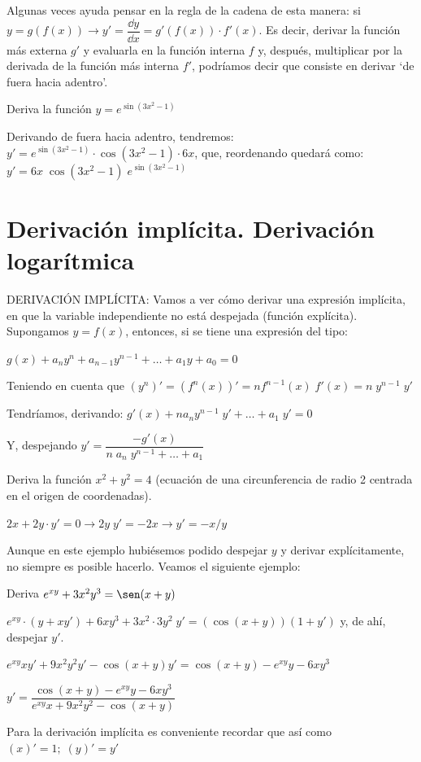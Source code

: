	Algunas veces ayuda pensar en la regla de la cadena de esta manera: si $y=g(f(x)) \to y'=\dfrac {\dd y}{\dd x}=g'(f(x))\cdot f'(x)$. Es decir, derivar la función más externa $g'$ y evaluarla en la función interna $f$ y, después, multiplicar por la derivada de la función más interna $f'$, podríamos decir que consiste en derivar `de fuera hacia adentro'.
	
	\begin{ejem} Deriva la función $y=e^{\sin (3x^2-1)}$
	
	Derivando de fuera hacia adentro, tendremos: $y'=e^{\sin (3x^2-1)}\cdot \cos(3x^2-1) \cdot 6x$, que, reordenando quedará como: $ y'=6x \; \cos(3x^2-1) \; e^{\sin (3x^2-1)}$	
	\end{ejem}
	
	\section{Derivación implícita. Derivación logarítmica}
	
	DERIVACIÓN IMPLÍCITA: Vamos a ver cómo derivar una expresión implícita, en que la variable independiente no está despejada (función explícita). Supongamos $y=f(x)$, entonces, si se tiene una expresión del tipo:
	
	$g(x)+a_ny^n+a_{n-1}y^{n-1}+ \dots + a_1y+a_0=0$
	
	Teniendo en cuenta que $(y^n)'=(f^n(x))'=nf^{n-1}(x)\; f'(x)=n\; y^{n-1}\; y'$
	
	Tendríamos, derivando: $g'(x)+n a_n y^{n-1}\; y' +\dots +a_1\; y' =0$
	
	Y, despejando $y'=\dfrac {-g'(x)}{n\; a_n\; y^{n-1} + \dots + a_1}$
	
	\begin{ejem} Deriva la función $x^2+y^2=4$ \textcolor{gris}{(ecuación de una circunferencia de radio 2 centrada en el origen de coordenadas)}.
	
	$2x+2y\cdot y'=0 \to 2y\; y'=-2x \to y'=-x/y$	
	\end{ejem}

	Aunque en este ejemplo hubiésemos podido despejar $y$ y derivar explícitamente, no siempre es posible hacerlo. Veamos el siguiente ejemplo:
	
	\begin{ejem} Deriva $e^{xy}+3x^2y^3=\sen(x+y)$
	
	$e^{xy}\cdot (y+xy')+ 6 x y^3 + 3x^2 \cdot 3y^2\; y' = (\cos(x+y))(1+y') $ y, de ahí, despejar $y'$.
	
	$e^{xy}xy'+9x^2y^2y'-\cos(x+y)y'=\cos(x+y)-e^{xy}y - 6xy^3$
	
	$y'=\dfrac{\cos(x+y)-e^{xy}y - 6xy^3}{e^{xy}x+9x^2y^2-\cos(x+y)}$ 
	
	Para la derivación implícita es conveniente recordar que así como $(x)'=1; \; (y)'=y'$
	\end{ejem}
	
